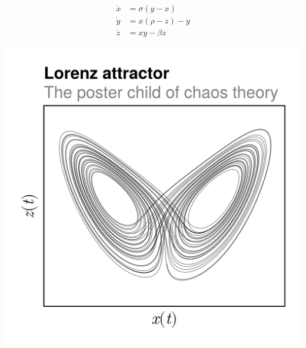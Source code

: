 \documentclass[aspectratio=169, usenames, dvipsnames]{beamer}
\begin{document}
{\begin{frame}
\begin{minipage}{.48\textwidth}
      {
        \Large
        \[
          \begin{aligned}
            \dot{x} & = \sigma \left( y - x \right) \\
            \dot{y} & = x \left( \rho - z \right) - y \\
            \dot{z} & = xy - \beta z
          \end{aligned}
        \]
      }
    \end{minipage}%
    \hfill
    \begin{minipage}{.48\textwidth}
      \centering
      \includegraphics[width=\textwidth]{Lorenz_attractor}
    \end{minipage}
    \vfill
  \end{frame}

}
\end{document}
